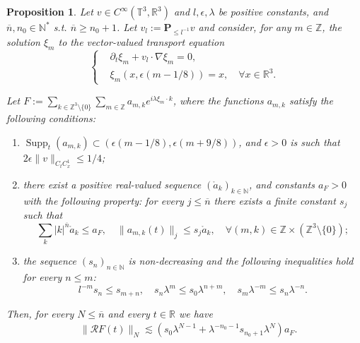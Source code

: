 \documentclass[10pt,a4paper]{amsart}
\numberwithin{equation}{section}
\numberwithin{corollario}{section}
\numberwithin{lemma}{section}
\newtheorem{prop}{Proposition}
\numberwithin{prop}{section}
\theoremstyle{definition}
\theoremstyle{remark}
\newcommand{\N}{\mathbb{N}}
\newcommand{\Z}{\mathbb{Z}}
\newcommand{\R}{\mathbb{R}}
\newcommand{\T}{\mathbb{T}}
\newcommand{\proj}{\mathbf{P}}
\DeclareMathOperator{\supp}{Supp}
\begin{document}
\begin{prop}\label{prop:antidiv1}
    Let $v\in C^{\infty}(\T^3,\R^3)$ and $l,\epsilon,\lambda$ be positive constants, and $\overline{n},n_0\in \N^*$ s.t. $\overline{n}\geq n_0+1$.
   Let $v_l:=\proj_{\le l^{-1}}v$ and consider, for any $m\in \Z$, the solution $\xi_m$ to the vector-valued transport equation 
    \begin{equation}
    \begin{cases}
        &\partial_t \xi_m+v_l\cdot \nabla \xi_m=0,\\
        &\xi_m(x,\epsilon(m-1/8))=x, \quad \forall x \in \R^3.
    \end{cases}
\end{equation}

Let $F:=\sum_{k\in\Z^3\setminus\{0\}}\sum_{m\in\Z}a_{m,k}e^{i\lambda\xi_m\cdot k}$, where the functions $a_{m,k}$ satisfy the following conditions:
\begin{enumerate}
    \item\label{ass:SupportTime} $\supp_t(a_{m,k})\subset (\epsilon(m-1/8),\epsilon(m+9/8))$, and $\epsilon>0$ is such that $2\epsilon\|v\|_{C_tC^1_x}\le1/4$;\\
    \item\label{ass:estimateAmk} there exist a positive real-valued sequence $(\mathring{a}_k)_{k \in \N}$, and constants $a_F>0$ with the following property: for every {$j \le  \overline{n}
    $} there exists a finite constant $s_j$ such that
    \begin{equation}
       \sum_k|k|^{{\overline{n}}}\mathring{a}_k\le a_F, \quad \|a_{m,k}(t)\|_j\leq  s_j\mathring{a}_k, \quad
       \forall (m,k) \in \Z \times (\Z^3 \setminus \{0\});
    \end{equation}

    \item\label{ass:s_n} the sequence $(s_n)_{n \in \N}$ is non-decreasing and the following inequalities hold for every $n \leq m$: 
    \[l^{-m}s_n\le s_{m+n},\quad s_n\lambda^m\le  s_0\lambda^{n+m}, \quad s_m\lambda^{-m}\le s_n\lambda^{-n}.\]
\end{enumerate}
Then, for every {$N \le \overline{n}$} and every $t \in \R$ we have
\begin{align}
    &\label{e:Antidiv1}\|\mathcal{R}F(t)\|_N\lesssim \left(s_0\lambda^{N-1}+\lambda^{-n_0-1}s_{n_0+1}\lambda^N\right)a_F.
\end{align}
\end{prop}
\end{document}
